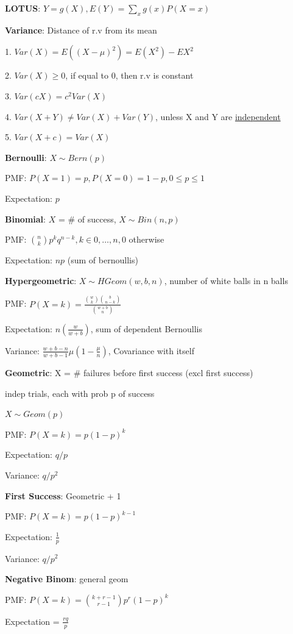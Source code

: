 \documentclass[10pt, a4paper]{article}
\begin{document}
\begin{multicols*}{3}
		\textbf{LOTUS}: $Y = g(X), E(Y) = \sum_{x} g(x) P(X = x)$

		\textbf{Variance}: Distance of r.v from its mean

		1. $Var(X) = E((X - \mu)^2) = E(X^2) - EX^2$

		2. $Var(X) \geq 0$, if equal to 0, then r.v is constant 

		3. $Var(cX) = c^2Var(X)$

		4. $Var(X + Y) \neq Var(X) + Var(Y)$, unless X and Y are \underline{independent}

		5. $Var(X + c) = Var(X)$

		\textbf{Bernoulli}: $X \sim Bern(p)$
		
		PMF: $P(X = 1) = p, P(X = 0) = 1-p, 0 \leq p \leq 1$

		Expectation: $p$

		\textbf{Binomial}: $X$ = \# of success, $X \sim Bin(n, p)$

		PMF: $\binom{n}{k} p^k q^{n - k}, k \in {0,\dots,n}, 0$ otherwise

		Expectation: $np$ (sum of bernoullis)

		\textbf{Hypergeometric}: $X \sim HGeom(w, b, n)$, number of white balls in n balls

		PMF: $P(X = k) = \frac{\binom{w}{k} \binom{b}{n - k}}{\binom{w + b}{n}}$

		Expectation: $n(\frac{w}{w + b})$, sum of dependent Bernoullis

		Variance: $\frac{w + b - n}{w + b - 1} \mu (1 - \frac{\mu}{n})$, Covariance with itself

		\textbf{Geometric}: X = \# failures before first success (excl first success)

		indep trials, each with prob p of success

		$X \sim Geom(p)$

		PMF: $P(X = k) = p(1-p)^k$

		Expectation: $q/p$

		Variance: $q / p^2$

		\textbf{First Success}: Geometric + 1

		PMF: $P(X = k) = p(1-p)^{k - 1}$

		Expectation: $\frac{1}{p}$

		Variance: $q / p^2$

		\textbf{Negative Binom}: general geom 

		PMF: $P(X = k) = \binom{k + r - 1}{r - 1}p^r(1-p)^k$

		Expectation = $\frac{rq}{p}$


\end{multicols*}
\end{document}
